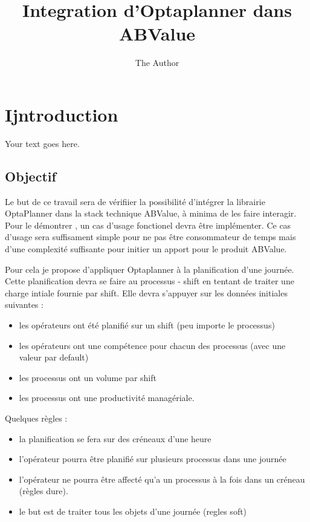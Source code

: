 \documentclass[11pt]{article} %
\title{Integration d'Optaplanner dans ABValue}
\author{The Author}
\begin{document}
\maketitle

\section{Ijntroduction}

Your text goes here.

\subsection{Objectif}
Le but de ce travail sera de vérifiier la possibilité d'intégrer la librairie OptaPlanner dans la stack technique ABValue, à minima de les faire interagir.
Pour le démontrer , un cas d'usage fonctionel devra être implémenter.
Ce cas d'usage sera suffisament simple pour ne pas être consommateur de temps mais d'une complexité suffisante pour initier un apport pour le produit ABValue.

Pour cela je propose d'appliquer Optaplanner à la planification d'une journée. Cette planification devra se faire au processus - shift en tentant de traiter une charge intiale fournie par shift.
Elle devra s'appuyer sur les données initiales suivantes :
\begin{itemize}
 \item les opérateurs ont été planifié sur un shift (peu importe le processus)
 \item les opérateurs ont une compétence pour chacun des processus (avec une valeur par default)
  \item les processus ont un volume par shift 
 \item les processus ont une productivité managériale.
\end{itemize}

Quelques règles :
\begin{itemize}
 \item la planification se fera sur des créneaux d'une heure 
 \item l'opérateur pourra être planifié sur plusieurs processus dans une journée
 \item l'opérateur ne pourra être affecté qu'a un processus à la fois dans un créneau (règles  dure).
 \item le but est de traiter tous les objets d'une journée (regles soft)
\end{itemize}
\end{document}

